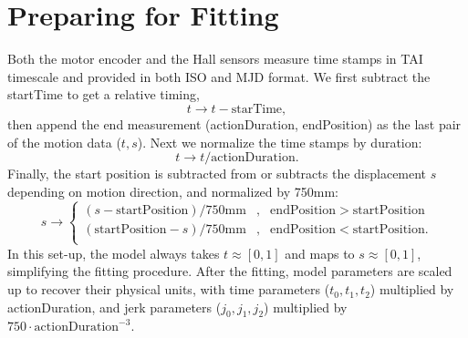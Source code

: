\documentclass[CTN,lsstdraft,authoryear,toc]{lsstdoc}
\newcommand{\eq}[1]{\begin{equation}#1\end{equation}}
\newcommand{\ead}[1]{\begin{aligned}#1\end{aligned}}
\begin{document}
\section{Preparing for Fitting}
Both the motor encoder and the Hall sensors measure time stamps in TAI timescale and provided in both ISO and MJD format.  We first subtract the startTime to get a relative timing,
\begin{equation}
    t \to t - \mathrm{starTime},
\end{equation}
then append the end measurement (actionDuration, endPosition) as the last pair of the motion data ($t, s$). Next we normalize the time stamps by duration:
\eq{
    t \to t/\mathrm{actionDuration}.
}
Finally, the start position is subtracted from or subtracts the displacement $s$ depending on motion direction, and normalized by 750mm:
\eq{
	s \to
	\left\{ \ead{
			(s - \mathrm{startPosition})/750 \mathrm{mm} &, & \mathrm{endPosition} > \mathrm{startPosition}  \\
			(\mathrm{startPosition} - s)/750 \mathrm{mm} &, & \mathrm{endPosition} < \mathrm{startPosition}.  \\
}
\right.
}
In this set-up, the model always takes $t \approx [0,1]$ and maps to $s \approx [0,1]$, simplifying the fitting procedure. After the fitting, model parameters are scaled up to recover their physical units, with time parameters ($t_0, t_1, t_2$) multiplied by actionDuration, and jerk parameters ($j_0, j_1, j_2$) multiplied by $750 \cdot \mathrm{actionDuration}^{-3}$.
\end{document}
